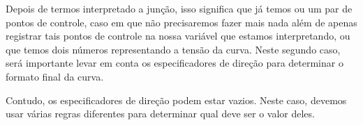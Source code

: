 {Depois de termos interpretado a junção, isso significa que já temos ou
um par de pontos de controle, caso em que não precisaremos fazer mais
nada além de apenas registrar tais pontos de controle na nossa
variável que estamos interpretando, ou que temos dois números
representando a tensão da curva. Neste segundo caso, será importante
levar em conta os especificadores de direção para determinar o formato
final da curva.

Contudo, os especificadores de direção podem estar vazios. Neste caso,
devemos usar várias regras diferentes para determinar qual deve ser o
valor deles.






%


%


%

}
